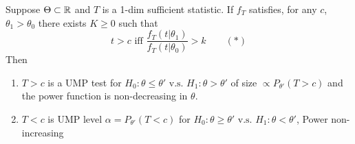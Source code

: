 \documentclass[english, 11pt]{article}
\begin{document}
\begin{thrm}\label{thrm:514}
Suppose $\Theta\subset{\mathbb{R}}$ and $T$ is a 1-dim sufficient statistic. If $f_T$ satisfies, for any $c$, $\theta_1>\theta_0$ there exists $K\geqslant0$ such that
$$
t>c\text{ iff }\frac{f_T(t|\theta_1)}{f_T(t|\theta_0)}>k\qquad(*)
$$
Then
\begin{enumerate}
\item $T>c$ is a UMP test for $H_0:\theta\leqslant\theta'\text{ v.s. }H_1:\theta>\theta'$ of size $\propto P_{\theta'}(T>c)$ and the power function is non-decreasing in $\theta$.
\item $T<c$ is UMP level $\alpha=P_{\theta'}(T<c)$ for $H_0:\theta\geqslant \theta'\text{ v.s. }H_1:\theta<\theta'$, Power non-increasing
\end{enumerate}
\end{thrm}
\end{document}
